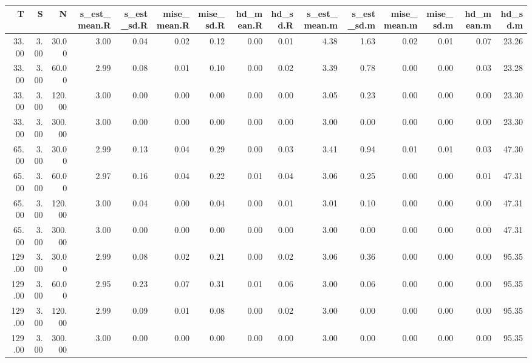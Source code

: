 \begin{table}[ht]
\centering
\begin{tabular}{rrrrrrrrrrrrrrr}
  \hline
T & S & N & s\_est\_mean.R & s\_est\_sd.R & mise\_mean.R & mise\_sd.R & hd\_mean.R & hd\_sd.R & s\_est\_mean.m & s\_est\_sd.m & mise\_mean.m & mise\_sd.m & hd\_mean.m & hd\_sd.m \\ 
  \hline
33.00 & 3.00 & 30.00 & 3.00 & 0.04 & 0.02 & 0.12 & 0.00 & 0.01 & 4.38 & 1.63 & 0.02 & 0.01 & 0.07 & 23.26 \\ 
  33.00 & 3.00 & 60.00 & 2.99 & 0.08 & 0.01 & 0.10 & 0.00 & 0.02 & 3.39 & 0.78 & 0.00 & 0.00 & 0.03 & 23.28 \\ 
  33.00 & 3.00 & 120.00 & 3.00 & 0.00 & 0.00 & 0.00 & 0.00 & 0.00 & 3.05 & 0.23 & 0.00 & 0.00 & 0.00 & 23.30 \\ 
  33.00 & 3.00 & 300.00 & 3.00 & 0.00 & 0.00 & 0.00 & 0.00 & 0.00 & 3.00 & 0.00 & 0.00 & 0.00 & 0.00 & 23.30 \\ 
  65.00 & 3.00 & 30.00 & 2.99 & 0.13 & 0.04 & 0.29 & 0.00 & 0.03 & 3.41 & 0.94 & 0.01 & 0.01 & 0.03 & 47.30 \\ 
  65.00 & 3.00 & 60.00 & 2.97 & 0.16 & 0.04 & 0.22 & 0.01 & 0.04 & 3.06 & 0.25 & 0.00 & 0.00 & 0.01 & 47.31 \\ 
  65.00 & 3.00 & 120.00 & 3.00 & 0.04 & 0.00 & 0.04 & 0.00 & 0.01 & 3.01 & 0.10 & 0.00 & 0.00 & 0.00 & 47.31 \\ 
  65.00 & 3.00 & 300.00 & 3.00 & 0.00 & 0.00 & 0.00 & 0.00 & 0.00 & 3.00 & 0.00 & 0.00 & 0.00 & 0.00 & 47.31 \\ 
  129.00 & 3.00 & 30.00 & 2.99 & 0.08 & 0.02 & 0.21 & 0.00 & 0.02 & 3.06 & 0.36 & 0.00 & 0.00 & 0.00 & 95.35 \\ 
  129.00 & 3.00 & 60.00 & 2.95 & 0.23 & 0.07 & 0.31 & 0.01 & 0.06 & 3.00 & 0.06 & 0.00 & 0.00 & 0.00 & 95.35 \\ 
  129.00 & 3.00 & 120.00 & 2.99 & 0.09 & 0.01 & 0.08 & 0.00 & 0.02 & 3.00 & 0.00 & 0.00 & 0.00 & 0.00 & 95.35 \\ 
  129.00 & 3.00 & 300.00 & 3.00 & 0.00 & 0.00 & 0.00 & 0.00 & 0.00 & 3.00 & 0.00 & 0.00 & 0.00 & 0.00 & 95.35 \\ 
   \hline
\end{tabular}
\end{table}
